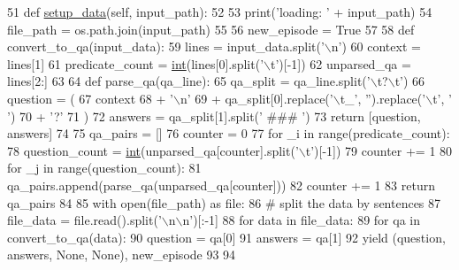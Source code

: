 \begin{DoxyCode}
51     \textcolor{keyword}{def }\hyperlink{namespaceparlai_1_1tasks_1_1multinli_1_1agents_a4fa2cb0ba1ed745336ad8bceed36b841}{setup\_data}(self, input\_path):
52 
53         print(\textcolor{stringliteral}{'loading: '} + input\_path)
54         file\_path = os.path.join(input\_path)
55 
56         new\_episode = \textcolor{keyword}{True}
57 
58         \textcolor{keyword}{def }convert\_to\_qa(input\_data):
59             lines = input\_data.split(\textcolor{stringliteral}{'\(\backslash\)n'})
60             context = lines[1]
61             predicate\_count = \hyperlink{namespacelanguage__model_1_1eval__ppl_a7d12ee00479673c5c8d1f6d01faa272a}{int}(lines[0].split(\textcolor{stringliteral}{'\(\backslash\)t'})[-1])
62             unparsed\_qa = lines[2:]
63 
64             \textcolor{keyword}{def }parse\_qa(qa\_line):
65                 qa\_split = qa\_line.split(\textcolor{stringliteral}{'\(\backslash\)t?\(\backslash\)t'})
66                 question = (
67                     context
68                     + \textcolor{stringliteral}{'\(\backslash\)n'}
69                     + qa\_split[0].replace(\textcolor{stringliteral}{'\(\backslash\)t\_'}, \textcolor{stringliteral}{''}).replace(\textcolor{stringliteral}{'\(\backslash\)t'}, \textcolor{stringliteral}{' '})
70                     + \textcolor{stringliteral}{'?'}
71                 )
72                 answers = qa\_split[1].split(\textcolor{stringliteral}{' ### '})
73                 \textcolor{keywordflow}{return} [question, answers]
74 
75             qa\_pairs = []
76             counter = 0
77             \textcolor{keywordflow}{for} \_i \textcolor{keywordflow}{in} range(predicate\_count):
78                 question\_count = \hyperlink{namespacelanguage__model_1_1eval__ppl_a7d12ee00479673c5c8d1f6d01faa272a}{int}(unparsed\_qa[counter].split(\textcolor{stringliteral}{'\(\backslash\)t'})[-1])
79                 counter += 1
80                 \textcolor{keywordflow}{for} \_j \textcolor{keywordflow}{in} range(question\_count):
81                     qa\_pairs.append(parse\_qa(unparsed\_qa[counter]))
82                     counter += 1
83             \textcolor{keywordflow}{return} qa\_pairs
84 
85         with open(file\_path) \textcolor{keyword}{as} file:
86             \textcolor{comment}{# split the data by sentences}
87             file\_data = file.read().split(\textcolor{stringliteral}{'\(\backslash\)n\(\backslash\)n'})[:-1]
88         \textcolor{keywordflow}{for} data \textcolor{keywordflow}{in} file\_data:
89             \textcolor{keywordflow}{for} qa \textcolor{keywordflow}{in} convert\_to\_qa(data):
90                 question = qa[0]
91                 answers = qa[1]
92                 \textcolor{keywordflow}{yield} (question, answers, \textcolor{keywordtype}{None}, \textcolor{keywordtype}{None}), new\_episode
93 
94 
\end{DoxyCode}



